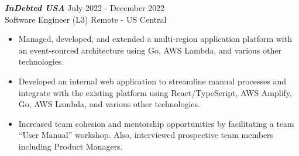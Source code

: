 {\sl \textbf{InDebted USA}} \hfill July 2022 - December 2022 \\ Software Engineer (L3) \hfill Remote - US Central
\begin{itemize}
    \item Managed, developed, and extended a multi-region application platform with an event-sourced architecture using Go, AWS Lambda, and various other technologies.
    \item Developed an internal web application to streamline manual processes and integrate with the existing platform using React/TypeScript, AWS Amplify, Go, AWS Lambda, and various other technologies.
    \item Increased team cohesion and mentorship opportunities by facilitating a team ``User Manual'' workshop. Also, interviewed prospective team members including Product Managers.
\end{itemize}
